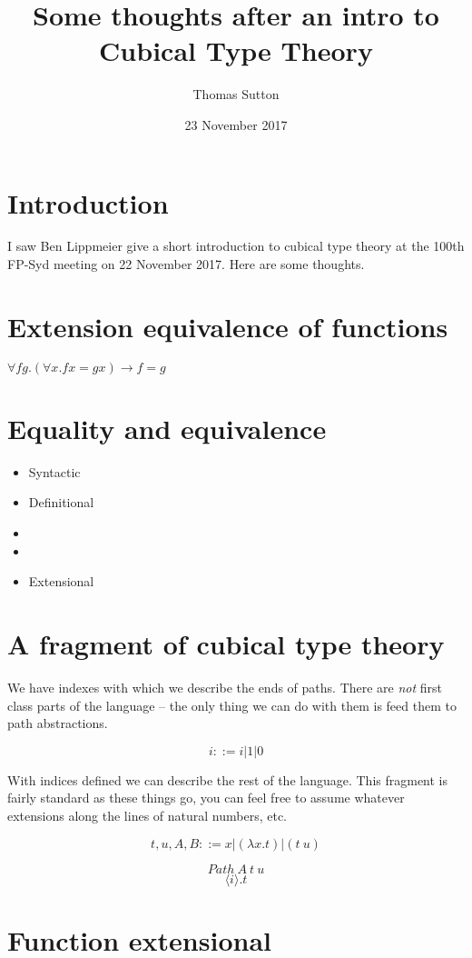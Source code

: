 \documentclass[a4paper]{article}
\title{Some thoughts after an intro to Cubical Type Theory}
\author{Thomas Sutton}
\date{23 November 2017}
\newcommand{\labs}[2]{(\lambda #1 . #2)}
\newcommand{\lapp}[2]{(#1 \: #2)}
\newcommand{\pabs}[2]{{\langle #1 \rangle}.{#2}}
\newcommand{\Path}[3]{{Path\:{#1}\:{#2}\:{#3}}}
\begin{document}
\maketitle

\section{Introduction}
I saw Ben Lippmeier give a short introduction to cubical type
theory\cite{DBLP:journals/corr/CohenCHM16} at the 100th FP-Syd meeting on 22 November
2017. Here are some thoughts.

\section{Extension equivalence of functions}

$\forall f g. (\forall x. f x = g x) \rightarrow f = g$

\section{Equality and equivalence}

\begin{itemize}
\item Syntactic
\item Definitional
\item
\item
\item Extensional
\end{itemize}

\section{A fragment of cubical type theory}

We have indexes with which we describe the ends of paths. There are
{\em not} first class parts of the language -- the only thing we can
do with them is feed them to path abstractions.

$$i ::= i | 1 | 0 $$

With indices defined we can describe the rest of the language. This
fragment is fairly standard as these things go, you can feel free to
assume whatever extensions along the lines of natural numbers, etc.

$$t,u,A,B ::= x | \labs{x}{t} | \lapp{t}{u} $$

$$\Path{A}{t}{u}$$
$$\pabs{i}{t}$$

\section{Function extensional}
\end{document}
